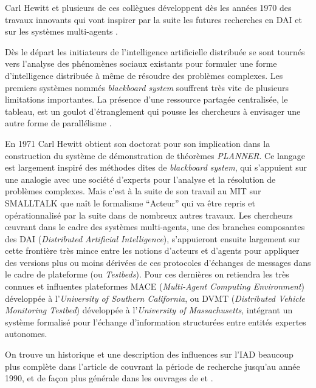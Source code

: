 Carl Hewitt et plusieurs de ces collègues développent dès les années 1970 des travaux innovants qui vont inspirer par la suite les futures recherches en DAI et sur les systèmes multi-agents \autocite{Ferber1995}.

Dès le départ les initiateurs de l'intelligence artificielle distribuée se sont tournés vers l'analyse des phénomènes sociaux existants pour formuler une forme d'intelligence distribuée à même de résoudre des problèmes complexes. Les premiers systèmes nommés \textit{blackboard system} souffrent très vite de plusieurs limitations importantes. La présence d'une ressource partagée centralisée, le tableau, est un goulot d'étranglement qui pousse les chercheurs à envisager une autre forme de parallélisme \autocite{Wooldridge2009}.

En 1971 Carl Hewitt obtient son doctorat pour son implication dans la construction du système de démonstration de théorèmes \textit{PLANNER}. Ce langage est largement inspiré des méthodes dites de \textit{blackboard system}, qui s'appuient sur une analogie avec une société d'experts pour l'analyse et la résolution de problèmes complexes. Mais c'est à la suite de son travail au MIT sur SMALLTALK que naît le formalisme \enquote{Acteur} qui va être repris et opérationnalisé par la suite dans de nombreux autres travaux. Les chercheurs œuvrant dans le cadre des systèmes multi-agents, une des branches composantes des DAI (\textit{Distributed Artificial Intelligence}), s’appuieront ensuite largement sur cette frontière très mince entre les notions d'acteurs et d'agents pour appliquer des versions plus ou moins dérivées de ces protocoles d'échanges de messages dans le cadre de plateforme (ou \textit{Testbeds}). Pour ces dernières on retiendra les très connues et influentes plateformes MACE (\textit{Multi-Agent Computing Environment}) développée à l'\textit{University of Southern California}, ou DVMT (\textit{Distributed Vehicle Monitoring Testbed}) développée à l'\textit{University of Massachusetts}, intégrant un système formalisé pour l'échange d'information structurées entre entités expertes autonomes.

On trouve un historique et une description des influences sur l'IAD beaucoup plus complète dans l'article de \textcite{Bond1988} couvrant la période de recherche jusqu'au année 1990, et de façon plus générale dans les ouvrages de \textcite{Wooldridge2009} et \textcite{Ferber1995}. 

